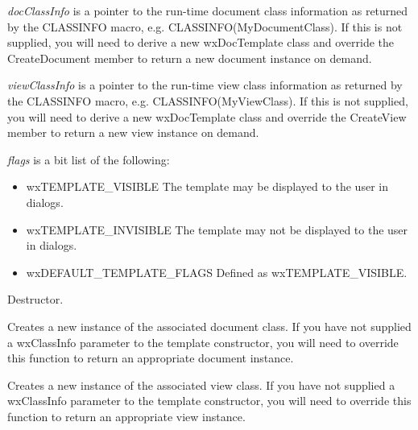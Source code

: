 {\it docClassInfo} is a pointer to the run-time document class information as returned
by the CLASSINFO macro, e.g. CLASSINFO(MyDocumentClass). If this is not supplied,
you will need to derive a new wxDocTemplate class and override the CreateDocument
member to return a new document instance on demand.

{\it viewClassInfo} is a pointer to the run-time view class information as returned
by the CLASSINFO macro, e.g. CLASSINFO(MyViewClass). If this is not supplied,
you will need to derive a new wxDocTemplate class and override the CreateView
member to return a new view instance on demand.

{\it flags} is a bit list of the following:

\begin{itemize}\itemsep=0pt
\item wxTEMPLATE\_VISIBLE The template may be displayed to the user in dialogs.
\item wxTEMPLATE\_INVISIBLE The template may not be displayed to the user in dialogs.
\item wxDEFAULT\_TEMPLATE\_FLAGS Defined as wxTEMPLATE\_VISIBLE.
\end{itemize}



Destructor.



Creates a new instance of the associated document class. If you have not supplied
a wxClassInfo parameter to the template constructor, you will need to override this
function to return an appropriate document instance.



Creates a new instance of the associated view class. If you have not supplied
a wxClassInfo parameter to the template constructor, you will need to override this
function to return an appropriate view instance.



